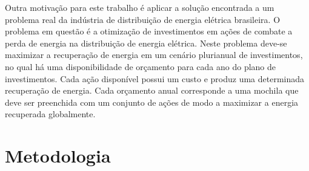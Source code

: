 \documentclass[brazil]{article}
\begin{document}
%




Outra motivação para este trabalho é aplicar a solução encontrada a um problema
real da indústria de distribuição de energia elétrica brasileira.
O problema em questão é a otimização de investimentos em ações de
combate a perda de energia na distribuição de energia elétrica.
Neste problema deve-se maximizar a recuperação de energia em um cenário plurianual
de investimentos, no qual há uma disponibilidade de orçamento para cada ano do plano de investimentos.
Cada ação disponível possui um custo e produz uma determinada recuperação de energia.
Cada orçamento anual corresponde a uma mochila que deve ser preenchida com um conjunto de ações
de modo a maximizar a energia recuperada globalmente.

\section{Metodologia}
\label{sec:metodologia}
\end{document}
